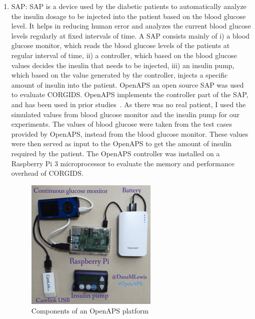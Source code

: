 \begin{enumerate}
\item \acf{SAP}: \ac{SAP} is a device used by the diabetic patients to automatically analyze the insulin dosage to be injected into the patient based on the blood glucose level. It helps in reducing human error and analyzes the current blood glucose levels regularly at fixed intervals of time. A \ac{SAP} consists mainly of i) a blood glucose monitor, which reads the blood glucose levels of the patients at regular interval of time, ii) a controller, which based on the blood glucose values decides the insulin that needs to be injected, iii) an insulin pump, which based on the value generated by the controller, injects a specific amount of insulin into the patient. \acf{OpenAPS} an open source \ac{SAP} was used to evaluate \ac{CORGIDS}. \ac{OpenAPS} implements the controller part of the \ac{SAP}, and has been used in prior studies~\cite{aliabadi2017artinali}. As there was no real patient, I used the simulated values from blood glucose monitor and the insulin pump for our experiments. The values of blood glucose were taken from the test cases provided by \ac{OpenAPS}, instead from the blood glucose monitor. These values were then served as input to the \ac{OpenAPS} to get the amount of insulin required by the patient. The OpenAPS controller was installed on a Raspberry Pi 3 microprocessor to evaluate the memory and performance overhead of \ac{CORGIDS}.

\begin{figure}[ht]
    \centering
    \includegraphics[scale=0.55,keepaspectratio = true]{Graphics/openaps.png}
    \caption{Components of an OpenAPS platform}
    \label{fig:OpenAPS}
\end{figure}
\end{enumerate}

